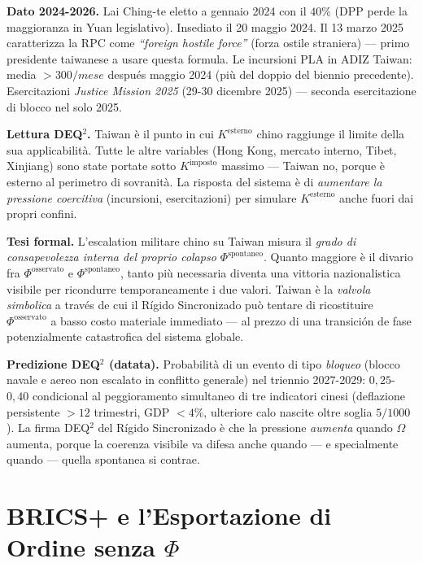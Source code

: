\Proved{} \textbf{Dato 2024-2026.} Lai Ching-te eletto a gennaio 2024
con il \(40\%\) (DPP perde la maggioranza in Yuan legislativo).
Insediato il 20 maggio 2024. Il 13 marzo 2025 caratterizza la RPC come
\emph{``foreign hostile force''} (forza ostile straniera) --- primo
presidente taiwanese a usare questa formula. Le incursioni PLA in ADIZ
Taiwan: media \(> 300/mese\) después maggio 2024 (più del doppio del
biennio precedente). Esercitazioni \emph{Justice Mission 2025} (29-30
dicembre 2025) --- seconda esercitazione di blocco nel solo 2025.

\Hypoth{} \textbf{Lettura DEQ$^2$.} Taiwan è il punto in cui
\(K^{\text{esterno}}\) chino raggiunge il limite della sua
applicabilità. Tutte le altre variables (Hong Kong, mercato interno,
Tibet, Xinjiang) sono state portate sotto \(K^{\text{imposto}}\) massimo
--- Taiwan no, porque è esterno al perimetro di sovranità. La risposta
del sistema è di \emph{aumentare la pressione coercitiva} (incursioni,
esercitazioni) per simulare \(K^{\text{esterno}}\) anche fuori dai
propri confini.

\Hypoth{} \textbf{Tesi formal.} L'escalation militare chino su Taiwan
misura il \emph{grado di consapevolezza interna del proprio colapso
\(\Phi^{\text{spontaneo}}\)}. Quanto maggiore è il divario fra
\(\Phi^{\text{osservato}}\) e \(\Phi^{\text{spontaneo}}\), tanto più
necessaria diventa una vittoria nazionalistica visibile per ricondurre
temporaneamente i due valori. Taiwan è la \emph{valvola simbolica}
a través de cui il Rígido Sincronizado può tentare di ricostituire
\(\Phi^{\text{osservato}}\) a basso costo materiale immediato --- al
prezzo di una transición de fase potenzialmente catastrofica del
sistema globale.

\Conj{} \textbf{Predizione DEQ$^2$ (datata).} Probabilità di un evento di
tipo \emph{bloqueo} (blocco navale e aereo non escalato in conflitto
generale) nel triennio 2027-2029: \(0{,}25\)-\(0{,}40\) condicional al
peggioramento simultaneo di tre indicatori cinesi (deflazione
persistente \(> 12\) trimestri, GDP \(< 4\%\), ulteriore calo nascite
oltre soglia \(5/1000\)). La firma DEQ$^2$ del Rígido Sincronizado è che
la pressione \emph{aumenta} quando \(\Omega\) aumenta, porque la
coerenza visibile va difesa anche quando --- e specialmente quando ---
quella spontanea si contrae.



\section{\texorpdfstring{BRICS+ e l'Esportazione di Ordine senza
\(\Phi\)}{BRICS+ e l'Esportazione di Ordine senza \textbackslash Phi}}\label{brics-e-lesportazione-di-ordine-senza-phi}

